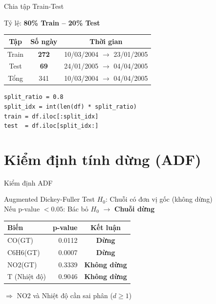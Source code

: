 \documentclass[serif, aspectratio=169]{beamer}
\newcommand{\red}[1]{\textbf{\color{hkustred}#1}}
\newcommand{\green}[1]{\textbf{\color{codegreen}#1}}
\begin{document}
\begin{frame}{Chia tập Train-Test}
    \begin{block}{Tỷ lệ: \red{80\% Train -- 20\% Test}}
    \end{block}
    
    \vspace{0.5cm}
    \begin{center}
        \begin{tabular}{|c|c|c|}
            \hline
            \textbf{Tập} & \textbf{Số ngày} & \textbf{Thời gian} \\ \hline
            Train & \red{272} & 10/03/2004 $\rightarrow$ 23/01/2005 \\ \hline
            Test & \red{69} & 24/01/2005 $\rightarrow$ 04/04/2005 \\ \hline
            Tổng & 341 & 10/03/2004 $\rightarrow$ 04/04/2005 \\ \hline
        \end{tabular}
    \end{center}
    
    \vspace{0.5cm}
    \begin{lstlisting}
split_ratio = 0.8
split_idx = int(len(df) * split_ratio)
train = df.iloc[:split_idx]
test  = df.iloc[split_idx:]
    \end{lstlisting}
\end{frame}

\section{Kiểm định tính dừng (ADF)}

\begin{frame}{Kiểm định ADF}
    \begin{block}{Augmented Dickey-Fuller Test}
        $H_0$: Chuỗi có đơn vị gốc (không dừng) \\
        Nếu p-value $< 0.05$: Bác bỏ $H_0$ $\rightarrow$ \green{Chuỗi dừng}
    \end{block}
    
    \vspace{0.5cm}
    \begin{center}
        \begin{tabular}{|l|r|c|}
            \hline
            \textbf{Biến} & \textbf{p-value} & \textbf{Kết luận} \\ \hline
            CO(GT) & 0.0112 & \green{Dừng} \\ \hline
            C6H6(GT) & 0.0007 & \green{Dừng} \\ \hline
            NO2(GT) & 0.3339 & \red{Không dừng} \\ \hline
            T (Nhiệt độ) & 0.9046 & \red{Không dừng} \\ \hline
        \end{tabular}
    \end{center}
    
    \vspace{0.3cm}
    $\Rightarrow$ NO2 và Nhiệt độ cần sai phân ($d \geq 1$)
\end{frame}
\end{document}
